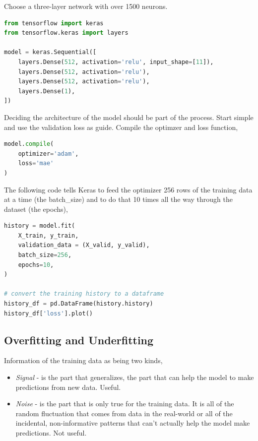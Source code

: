 \noindent Choose a three-layer network with over 1500 neurons. 

\begin{lstlisting}[language=Python]
from tensorflow import keras
from tensorflow.keras import layers

model = keras.Sequential([
    layers.Dense(512, activation='relu', input_shape=[11]),
    layers.Dense(512, activation='relu'),
    layers.Dense(512, activation='relu'),
    layers.Dense(1),
])
\end{lstlisting}

\noindent Deciding the architecture of the model should be part of the process.
Start simple and use the validation loss as guide. Compile the optimzer and loss
function,

\begin{lstlisting}[language=Python]
model.compile(
	optimizer='adam',
	loss='mae'
)
\end{lstlisting}

\noindent The following code tells Keras to feed the optimizer 256 rows of the training
data at a time (the batch\_size) and to do that 10 times all the way through the
dataset (the epochs),

\begin{lstlisting}[language=Python]
history = model.fit(
	X_train, y_train,
	validation_data = (X_valid, y_valid),
	batch_size=256,
	epochs=10,
)

# convert the training history to a dataframe
history_df = pd.DataFrame(history.history)
history_df['loss'].plot()
\end{lstlisting}

\subsection{Overfitting and Underfitting}
Information of the training data as being two kinds,
\begin{itemize}
	\item \emph{Signal} - is the part that generalizes, the part that can help
		the model to make predictions from new data. Useful.
	\item \emph{Noise} - is the part that is only true for the training data. It
		is all of the random fluctuation that comes from data in the real-world
		or all of the incidental, non-informative patterns that can't actually
		help the model make predictions. Not useful.
\end{itemize}

